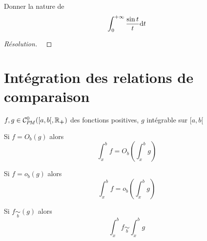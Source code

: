\begin{exo}
    Donner la nature de \[
        \int_0^{+\infty}\frac{\sin t}t\mathrm{d} t
    \]
\end{exo}

\begin{proof}[Résolution]~
\end{proof}


\section{Intégration des relations de comparaison}

\begin{thm}
    \Hyp $f,g\in \CPM([a, b[, \mathbb R_{\bm+})$ des fonctions positives, $g$ intégrable sur $[a, b[$
    \begin{concenum}
    \item Si $f=O_b(g)$ alors \[
            \int_x^bf=O_b \left( \int_x^bg \right)
        \]
    \item Si $f=o_b(g)$ alors \[
            \int_x^bf=o_b \left( \int_x^bg \right)
        \]
    \item Si $f\underset b\sim(g)$ alors \[
            \int_x^bf\underset b\sim \int_x^bg
        \]
    \end{concenum}
\end{thm}
